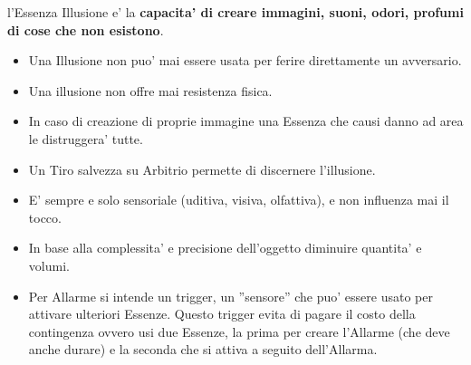 \documentclass[a4paper,11pt,twoside,openany]{book}
\begin{document}
	\label{essenza-illusione---magnetismo}
	
	l'Essenza Illusione e' la \textbf{capacita' di creare immagini, suoni,
		odori, profumi di cose che non esistono}.
	\begin{itemize}
		\item 
		Una Illusione non puo' mai essere usata per ferire direttamente un avversario. 
		\item 
		Una illusione non offre mai resistenza fisica. 
		\item 
		In caso di creazione di proprie immagine una Essenza che causi danno ad area le distruggera' tutte. 
		\item 
		Un Tiro salvezza su Arbitrio permette di discernere l'illusione. 
		\item 
		E' sempre e solo sensoriale (uditiva, visiva, olfattiva), e non influenza mai il tocco. 
		\item 
		In base alla complessita' e precisione dell'oggetto diminuire quantita' e volumi. 
		\item 
		Per Allarme si intende un trigger, un ''sensore'' che puo' essere usato per attivare ulteriori Essenze. Questo trigger evita di pagare il costo della contingenza ovvero usi due Essenze, la prima per creare l'Allarme (che deve anche durare) e la seconda che si attiva a seguito
		dell'Allarma. 
	\end{itemize}
	
	\bigskip
	
\end{document}
